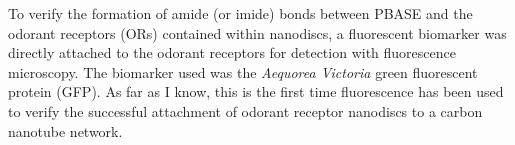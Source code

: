 \documentclass[
  a4paper,
]{scrbook}
\begin{document}
To verify the formation of amide (or imide) bonds between PBASE and the
odorant receptors (ORs) contained within nanodiscs, a fluorescent
biomarker was directly attached to the odorant receptors for detection
with fluorescence microscopy. The biomarker used was the \emph{Aequorea
Victoria} green fluorescent protein (GFP). As far as I know, this is the
first time fluorescence has been used to verify the successful
attachment of odorant receptor nanodiscs to a carbon nanotube network.

\begin{figure}

\begin{minipage}[t]{0.47\linewidth}

{\centering 


}

\subcaption{\label{fig-GFP-OR-ch6-zoom}}
\end{minipage}%
%
\begin{minipage}[t]{0.05\linewidth}

{\centering 

~

}

\end{minipage}%
%
\begin{minipage}[t]{0.47\linewidth}

{\centering 

\raisebox{-\height}{

}}
\end{minipage}
\end{figure}
\end{document}

